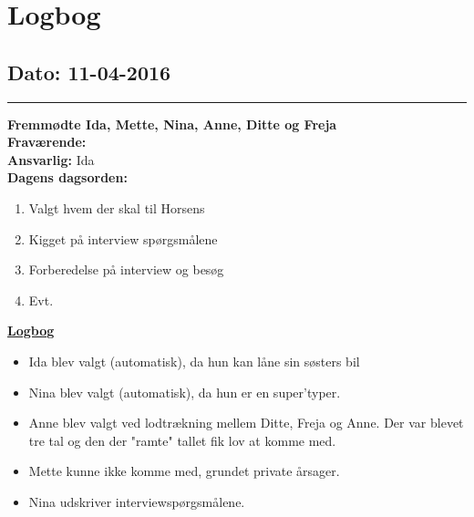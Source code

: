 \chapter{Logbog}
\section{Dato: 11-04-2016}
\hrule
\textbf{Fremmødte Ida, Mette, Nina, Anne, Ditte og Freja} \\
\textbf{Fraværende:} \\
\textbf{Ansvarlig:} Ida  \\
\textbf{Dagens dagsorden: }
\begin{enumerate}
	\item Valgt hvem der skal til Horsens
	\item Kigget på interview spørgsmålene
	\item Forberedelse på interview og besøg 
	\item Evt. 
\end{enumerate}

\underline{\textbf{Logbog}}
\begin{itemize}
\item Ida blev valgt (automatisk), da hun kan låne sin søsters bil
\item Nina blev valgt (automatisk), da hun er en super'typer.
\item Anne blev valgt ved lodtrækning mellem Ditte, Freja og Anne. Der var blevet tre tal og den der "ramte" tallet fik lov at komme med.
\item Mette kunne ikke komme med, grundet private årsager.
\item Nina udskriver interviewspørgsmålene. 
\end{itemize}
\newpage